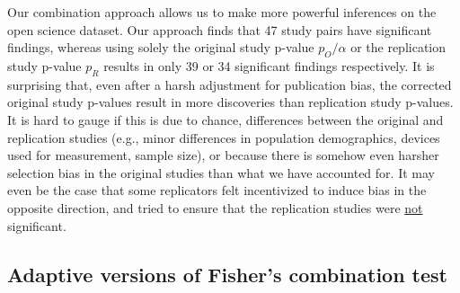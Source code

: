 \documentclass{article}
\begin{document}
Our combination approach allows us to make more powerful inferences on the open science dataset. Our approach finds that 47 study pairs have significant findings, whereas using solely the original study p-value $p_O/\alpha$ or the replication study p-value $p_R$ results in only 39 or 34 significant findings respectively. It is surprising that, even after a harsh adjustment for publication bias, the corrected original study p-values result in more discoveries than replication study p-values. It is hard to gauge if this is due to chance, differences between the original and replication studies (e.g., minor differences in population demographics, devices used for measurement, sample size), or because there is somehow even harsher selection bias in the original studies than what we have accounted for. It may even be the case that some replicators felt incentivized to induce bias in the opposite direction, and tried to ensure that the replication studies were \underline{not} significant. 

\subsection{Adaptive versions of Fisher's combination test}
\end{document}
